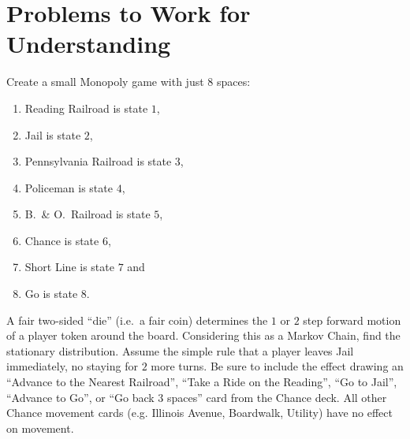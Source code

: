 \documentclass[12pt]{article}
\begin{document}


\hr

\section*{Problems to Work for Understanding}
\renewcommand{\theexerciseseries}{}
\renewcommand{\theexercise}{\arabic{exercise}}

\begin{exercise}
  Create a small Monopoly game with just \( 8 \) spaces:
  \begin{enumerate}
  \item Reading Railroad is state \( 1 \), 
  \item Jail is state \( 2 \), 
  \item Pennsylvania Railroad is state \( 3 \), 
  \item Policeman is state \( 4 \), 
  \item B.\ \& O.\ Railroad is state \( 5 \), 
  \item Chance is state \( 6 \), 
  \item Short Line is state \( 7 \) and 
  \item Go is state \( 8 \).
  \end{enumerate}
  A fair two-sided ``die'' (i.e.\ a fair coin) determines the \( 1 \)
  or \( 2 \) step forward motion of a player token around the board.
  Considering this as a Markov Chain, find the stationary
  distribution.  Assume the simple rule that a player leaves Jail
  immediately, no staying for \( 2 \) more turns.
  Be sure to include the effect drawing an ``Advance to the
  Nearest Railroad'', ``Take a Ride on the Reading'', ``Go to Jail'',
  ``Advance to Go'', or ``Go back \( 3 \) spaces'' card from the
  Chance deck.  All other Chance movement cards (e.g. Illinois Avenue,
  Boardwalk, Utility) have no effect on movement.
\end{exercise}
\end{document}
